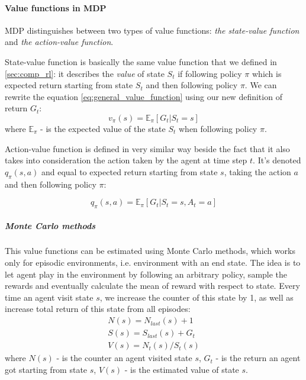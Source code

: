\paragraph{Value functions in MDP} MDP distinguishes between two types of value functions:
\emph{the state-value function} and \emph{the action-value function}.

State-value function is basically the same value function that we defined in \autoref{sec:comp_rl}:
it describes the \emph{value} of state $S_t$ if following policy $\pi$ which is expected return
starting from state $S_t$ and then following policy $\pi$. We can rewrite the equation \ref{eq:general_value_function}
using our new definition of return $G_t$:
\begin{equation} \label{eq:value_state}
	v_{\pi}(s) = \mathbb{E}_{\pi} [G_t |S_t = s]
\end{equation}
where $\mathbb{E}_{\pi}$ - is the expected value of the state $S_t$ when
following policy $\pi$.

Action-value function is defined in very similar way beside the fact that it also takes
into consideration the action taken by the agent at time step $t$. It's denoted $q_{\pi}(s, a)$
and equal to expected return starting from state $s$, taking the action $a$ and then following
policy $\pi$:

\begin{equation} \label{eq:action_value_func}
	q_{\pi}(s, a) = \mathbb{E}_{\pi} [G_t |S_t = s, A_t = a]
\end{equation}

\subparagraph{Monte Carlo methods}

This value functions can be estimated using Monte Carlo methods, which works
only for episodic environments, i.e. environment with an end state.
The idea is to let agent play in the environment by following an arbitrary policy,
sample the rewards and eventually calculate the mean of reward with respect to state.
Every time an agent visit state $s$, we increase the counter
of this state by 1, as well as increase total return of this state from all episodes:
\begin{align}
	N(s) = N_{last}(s) + 1 \\
	S(s) = S_{last}(s) + G_t\\
	V(s) = N_t(s) / S_t(s)
\end{align}
where $N(s)$ - is the counter an agent visited state $s$,
$G_t$ - is the return an agent got starting from state $s$,
$V(s)$ - is the estimated value of state $s$.

